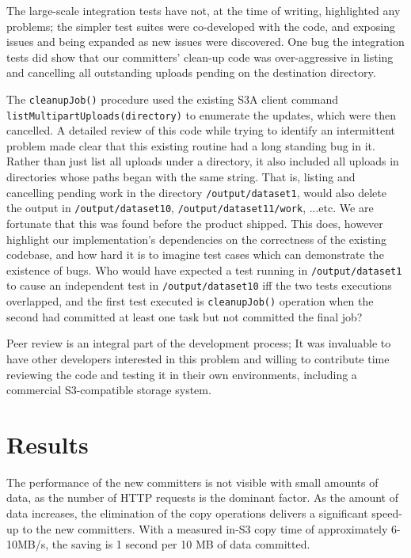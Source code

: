 \documentclass[conference]{IEEEtran}
\begin{document}
The large-scale integration tests have not, at the time of writing, highlighted any problems;
the simpler test suites were co-developed with the code, and exposing issues and
being expanded as new issues were discovered.
One bug the integration tests did show that our committers' clean-up code was
over-aggressive in listing and cancelling all outstanding uploads pending
on the destination directory.


The \texttt{cleanupJob()} procedure used the existing S3A client command
\texttt{listMultipartUploads(directory)} to enumerate the updates,
which were then cancelled.
A detailed review of this code while trying to identify an intermittent problem
made clear that this existing routine had a long standing bug in it.
Rather than just list all uploads under a directory, it also included
all uploads in directories whose paths began with the same string.
That is, listing and cancelling pending work in the directory \texttt{/output/dataset1},
would also delete the output in \texttt{/output/dataset10}, \texttt{/output/dataset11/work},
...etc.
We are fortunate that this was found before the product shipped.
This does, however highlight our implementation's dependencies on the correctness
of the existing codebase, and how hard it is to imagine test cases which
can demonstrate the existence of bugs.
Who would have expected a test running in \texttt{/output/dataset1} to
cause an independent test in \texttt{/output/dataset10} iff the two tests
executions overlapped, and the first test executed is \texttt{cleanupJob()}
operation when the second had committed at least one task but not committed
the final job?


Peer review is an integral part of the development process;
It was invaluable to have other developers interested in this problem
and willing to contribute time reviewing the code and testing it
in their own environments, including a commercial S3-compatible
storage system.



\section{Results}
\label{sec:results}


The performance of the new committers is not visible with small amounts
of data, as the number of HTTP requests is the dominant factor.
As the amount of data increases, the elimination of the copy operations
delivers a significant speed-up to the new committers.
With a measured in-S3 copy time of approximately 6-10MB/s, the saving is 1 second per 10 MB
of data committed.
\end{document}
